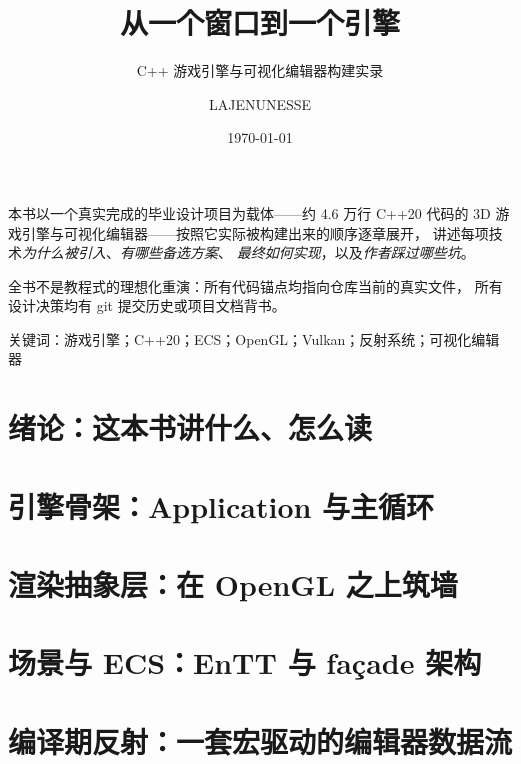\documentclass[%
  lang=cn,          %
  newtx,            %
  12pt,             %
  oneside,          %
  scheme=warmgreen, %
]{elegantbook}
\title{从一个窗口到一个引擎}
\subtitle{C++ 游戏引擎与可视化编辑器构建实录}
\author{LAJENUNESSE}
\date{\today}
\begin{document}
\frontmatter
\maketitle

\begin{introduction}
  \item 本书以一个真实完成的毕业设计项目为载体——约 4.6 万行 C++20 代码的
        3D 游戏引擎与可视化编辑器——按照它实际被构建出来的顺序逐章展开，
        讲述每项技术\emph{为什么被引入}、\emph{有哪些备选方案}、
        \emph{最终如何实现}，以及\emph{作者踩过哪些坑}。
  \item 全书不是教程式的理想化重演：所有代码锚点均指向仓库当前的真实文件，
        所有设计决策均有 git 提交历史或项目文档背书。
  \item 关键词：游戏引擎；C++20；ECS；OpenGL；Vulkan；反射系统；可视化编辑器
\end{introduction}

\tableofcontents

\mainmatter

\chapter{绪论：这本书讲什么、怎么读}
\label{ch:intro}


\chapter{引擎骨架：Application 与主循环}
\label{ch:core-loop}


\chapter{渲染抽象层：在 OpenGL 之上筑墙}
\label{ch:render-abstraction}


\chapter{场景与 ECS：EnTT 与 façade 架构}
\label{ch:scene-ecs}


\chapter{编译期反射：一套宏驱动的编辑器数据流}
\label{ch:reflection}

\end{document}

